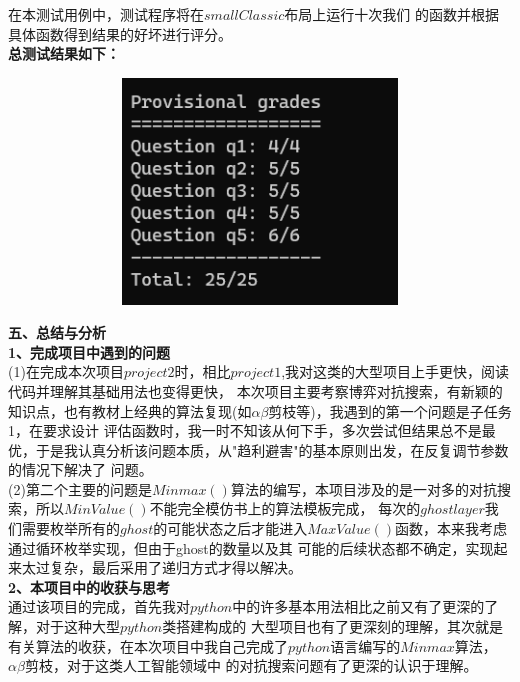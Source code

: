\documentclass[a4paper,12pt,UTF8]{article}
\begin{document}
\begin{flushleft}
{\begin{figure}[h]
    \end{figure}
    \normalsize{
        \hspace{1cm}在本测试用例中，测试程序将在$smallClassic$布局上运行十次我们
        的函数并根据具体函数得到结果的好坏进行评分。\\
    }
    \large{
        \hspace{1cm}\textbf{
           总测试结果如下：\\
        }
    }
    \begin{figure}[h]
        \centering
        \includegraphics[width=12cm,height=6cm]{all.png}
    \end{figure}
    \newpage
    \Large{
        \textbf{
            五、总结与分析\\
        }
    }
    \large{
        \textbf{
            1、完成项目中遇到的问题\\
        }
    }
    \normalsize{
       \hspace{1cm}(1)在完成本次项目$project2$时，相比$project1$,我对这类的大型项目上手更快，阅读代码并理解其基础用法也变得更快，
       本次项目主要考察博弈对抗搜索，有新颖的知识点，也有教材上经典的算法复现(如$\alpha \beta$剪枝等)，我遇到的第一个问题是子任务1，在要求设计
       评估函数时，我一时不知该从何下手，多次尝试但结果总不是最优，于是我认真分析该问题本质，从"趋利避害"的基本原则出发，在反复调节参数的情况下解决了
       问题。\\
       \hspace{1cm}(2)第二个主要的问题是$Minmax()$算法的编写，本项目涉及的是一对多的对抗搜索，所以$MinValue()$不能完全模仿书上的算法模板完成，
       每次的$ghost layer$我们需要枚举所有的$ghost$的可能状态之后才能进入$MaxValue()$函数，本来我考虑通过循环枚举实现，但由于ghost的数量以及其
       可能的后续状态都不确定，实现起来太过复杂，最后采用了递归方式才得以解决。\\
    }
    \large{
        \textbf{
            2、本项目中的收获与思考\\
        }
    }
    \normalsize{
        \hspace{1cm}通过该项目的完成，首先我对$python$中的许多基本用法相比之前又有了更深的了解，对于这种大型$python$类搭建构成的
        大型项目也有了更深刻的理解，其次就是有关算法的收获，在本次项目中我自己完成了$python$语言编写的$Minmax$算法，$\alpha \beta$剪枝，对于这类人工智能领域中
        的对抗搜索问题有了更深的认识于理解。\\
    }
}
\end{flushleft}
\end{document}
